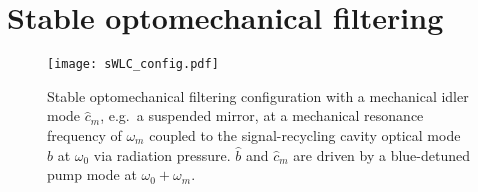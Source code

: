 


\section{Stable optomechanical filtering}
\label{sec:sWLC}

\begin{figure}[ht]
	\centering
	\texttt{[image: sWLC\_config.pdf]}
	\caption{Stable optomechanical filtering configuration with a mechanical idler mode $\hat{c}_m$, e.g.\ a suspended mirror, at a mechanical resonance frequency of $\omega_m$ coupled to the signal-recycling cavity optical mode $\hat b$ at $\omega_0$ via radiation pressure. $\hat b$ and $\hat{c}_m$ are driven by a blue-detuned pump mode at $\omega_0+\omega_m$.}
	\label{fig:sWLC_config}
\end{figure}


